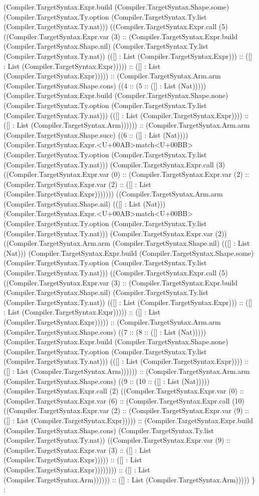 \documentclass[11pt]{article}
\begin{document}
(Compiler.TargetSyntax.Expr.build (Compiler.TargetSyntax.Shape.some) (Compiler.TargetSyntax.Ty.option (Compiler.TargetSyntax.Ty.list (Compiler.TargetSyntax.Ty.nat))) ((Compiler.TargetSyntax.Expr.call (5) ((Compiler.TargetSyntax.Expr.var (3) :: (Compiler.TargetSyntax.Expr.build (Compiler.TargetSyntax.Shape.nil) (Compiler.TargetSyntax.Ty.list (Compiler.TargetSyntax.Ty.nat)) (([] : List (Compiler.TargetSyntax.Expr))) :: ([] : List (Compiler.TargetSyntax.Expr))))) :: ([] : List (Compiler.TargetSyntax.Expr))))) :: (Compiler.TargetSyntax.Arm.arm (Compiler.TargetSyntax.Shape.cons) ((4 :: (5 :: ([] : List (Nat))))) (Compiler.TargetSyntax.Expr.build (Compiler.TargetSyntax.Shape.none) (Compiler.TargetSyntax.Ty.option (Compiler.TargetSyntax.Ty.list (Compiler.TargetSyntax.Ty.nat))) (([] : List (Compiler.TargetSyntax.Expr)))) :: ([] : List (Compiler.TargetSyntax.Arm)))))) :: (Compiler.TargetSyntax.Arm.arm (Compiler.TargetSyntax.Shape.succ) ((6 :: ([] : List (Nat)))) (Compiler.TargetSyntax.Expr.<U+00AB>match<U+00BB> (Compiler.TargetSyntax.Ty.option (Compiler.TargetSyntax.Ty.list (Compiler.TargetSyntax.Ty.nat))) (Compiler.TargetSyntax.Expr.call (3) ((Compiler.TargetSyntax.Expr.var (0) :: (Compiler.TargetSyntax.Expr.var (2) :: (Compiler.TargetSyntax.Expr.var (2) :: ([] : List (Compiler.TargetSyntax.Expr))))))) ((Compiler.TargetSyntax.Arm.arm (Compiler.TargetSyntax.Shape.nil) (([] : List (Nat))) (Compiler.TargetSyntax.Expr.<U+00AB>match<U+00BB> (Compiler.TargetSyntax.Ty.option (Compiler.TargetSyntax.Ty.list (Compiler.TargetSyntax.Ty.nat))) (Compiler.TargetSyntax.Expr.var (2)) ((Compiler.TargetSyntax.Arm.arm (Compiler.TargetSyntax.Shape.nil) (([] : List (Nat))) (Compiler.TargetSyntax.Expr.build (Compiler.TargetSyntax.Shape.some) (Compiler.TargetSyntax.Ty.option (Compiler.TargetSyntax.Ty.list (Compiler.TargetSyntax.Ty.nat))) ((Compiler.TargetSyntax.Expr.call (5) ((Compiler.TargetSyntax.Expr.var (3) :: (Compiler.TargetSyntax.Expr.build (Compiler.TargetSyntax.Shape.nil) (Compiler.TargetSyntax.Ty.list (Compiler.TargetSyntax.Ty.nat)) (([] : List (Compiler.TargetSyntax.Expr))) :: ([] : List (Compiler.TargetSyntax.Expr))))) :: ([] : List (Compiler.TargetSyntax.Expr))))) :: (Compiler.TargetSyntax.Arm.arm (Compiler.TargetSyntax.Shape.cons) ((7 :: (8 :: ([] : List (Nat))))) (Compiler.TargetSyntax.Expr.build (Compiler.TargetSyntax.Shape.none) (Compiler.TargetSyntax.Ty.option (Compiler.TargetSyntax.Ty.list (Compiler.TargetSyntax.Ty.nat))) (([] : List (Compiler.TargetSyntax.Expr)))) :: ([] : List (Compiler.TargetSyntax.Arm)))))) :: (Compiler.TargetSyntax.Arm.arm (Compiler.TargetSyntax.Shape.cons) ((9 :: (10 :: ([] : List (Nat))))) (Compiler.TargetSyntax.Expr.call (2) ((Compiler.TargetSyntax.Expr.var (0) :: (Compiler.TargetSyntax.Expr.var (6) :: (Compiler.TargetSyntax.Expr.call (10) ((Compiler.TargetSyntax.Expr.var (2) :: (Compiler.TargetSyntax.Expr.var (9) :: ([] : List (Compiler.TargetSyntax.Expr))))) :: (Compiler.TargetSyntax.Expr.build (Compiler.TargetSyntax.Shape.cons) (Compiler.TargetSyntax.Ty.list (Compiler.TargetSyntax.Ty.nat)) ((Compiler.TargetSyntax.Expr.var (9) :: (Compiler.TargetSyntax.Expr.var (3) :: ([] : List (Compiler.TargetSyntax.Expr))))) :: ([] : List (Compiler.TargetSyntax.Expr)))))))) :: ([] : List (Compiler.TargetSyntax.Arm)))))) :: ([] : List (Compiler.TargetSyntax.Arm))))) \} : 
\end{document}
